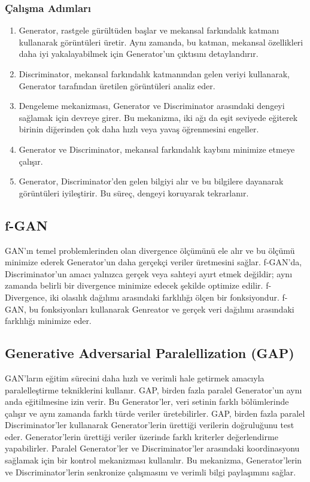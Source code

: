\subsubsection{Çalışma Adımları}

\begin{enumerate}
    \item Generator, rastgele gürültüden başlar ve mekansal farkındalık katmanı kullanarak görüntüleri üretir. Aynı zamanda, bu katman, mekansal özellikleri daha iyi yakalayabilmek için Generator'un çıktısını detaylandırır.
    \item Discriminator, mekansal farkındalık katmanından gelen veriyi kullanarak, Generator tarafından üretilen görüntüleri analiz eder.
    \item Dengeleme mekanizması, Generator ve Discriminator arasındaki dengeyi sağlamak için devreye girer. Bu mekanizma, iki ağı da eşit seviyede eğiterek birinin diğerinden çok daha hızlı veya yavaş öğrenmesini engeller.
    \item Generator ve Discriminator, mekansal farkındalık kaybını minimize etmeye çalışır.
    \item Generator, Discriminator'den gelen bilgiyi alır ve bu bilgilere dayanarak görüntüleri iyileştirir. Bu süreç, dengeyi koruyarak tekrarlanır.
\end{enumerate}

\newpage

\subsection{f-GAN}

GAN'ın temel problemlerinden olan divergence ölçümünü ele alır ve bu ölçümü minimize ederek Generator'un daha gerçekçi veriler üretmesini sağlar. f-GAN'da, Discriminator'un amacı yalnızca gerçek veya sahteyi ayırt etmek değildir; aynı zamanda belirli bir divergence minimize edecek şekilde optimize edilir. f-Divergence, iki olasılık dağılımı arasındaki farklılığı ölçen bir fonksiyondur. f-GAN, bu fonksiyonları kullanarak Genreator ve gerçek veri dağılımı arasındaki farklılığı minimize eder. 

\newpage

\subsection{Generative Adversarial Paralellization (GAP)}

GAN'ların eğitim sürecini daha hızlı ve verimli hale getirmek amacıyla paralelleştirme tekniklerini kullanır. GAP, birden fazla paralel Generator'un aynı anda eğitilmesine izin verir. Bu Generator'ler, veri setinin farklı bölümlerinde çalışır ve aynı zamanda farklı türde veriler üretebilirler. GAP, birden fazla paralel Discriminator'ler kullanarak Generator'lerin ürettiği verilerin doğruluğunu test eder. Generator'lerin ürettiği veriler üzerinde farklı kriterler değerlendirme yapabilirler. Paralel Generator'ler ve Discriminator'ler arasındaki koordinasyonu sağlamak için bir kontrol mekanizması kullanılır. Bu mekanizma, Generator'lerin ve Discriminator'lerin senkronize çalışmasını ve verimli bilgi paylaşımını sağlar.

